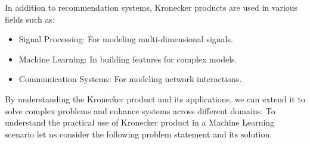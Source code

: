 \documentclass[
  letterpaper,
  DIV=11,
  numbers=noendperiod]{scrreprt}
\providecommand{\tightlist}{%
  \setlength{\itemsep}{0pt}\setlength{\parskip}{0pt}}\usepackage{longtable,booktabs,array}
\theoremstyle{plain}
\theoremstyle{definition}
\theoremstyle{remark}
\begin{document}
In addition to recommendation systems, Kronecker products are used in
various fields such as:

\begin{itemize}
\tightlist
\item
  Signal Processing: For modeling multi-dimensional signals.
\item
  Machine Learning: In building features for complex models.
\item
  Communication Systems: For modeling network interactions.
\end{itemize}

By understanding the Kronecker product and its applications, we can
extend it to solve complex problems and enhance systems across different
domains. To understand the practical use of Kronecker product in a
Machine Learning scenario let us consider the following problem
statement and its solution.
\end{document}
